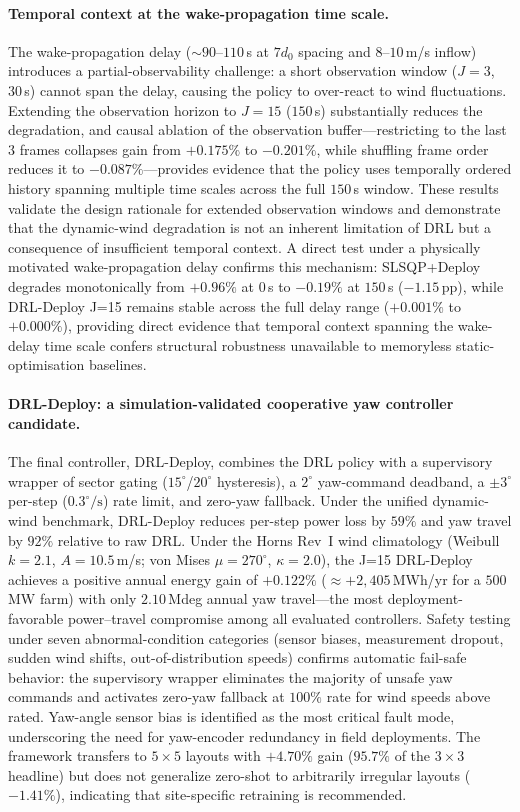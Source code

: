 \documentclass[final,5p,times]{elsarticle}
\begin{document}
\paragraph{Temporal context at the wake-propagation time scale.}
The wake-propagation delay (${\sim}90$--$110$\,s at $7d_0$ spacing and $8$--$10$\,m/s inflow) introduces a partial-observability challenge: a short observation window ($J{=}3$, $30$\,s) cannot span the delay, causing the policy to over-react to wind fluctuations. Extending the observation horizon to $J{=}15$ ($150$\,s) substantially reduces the degradation, and causal ablation of the observation buffer---restricting to the last $3$ frames collapses gain from $+0.175\%$ to $-0.201\%$, while shuffling frame order reduces it to $-0.087\%$---provides evidence that the policy uses temporally ordered history spanning multiple time scales across the full $150$\,s window. These results validate the design rationale for extended observation windows and demonstrate that the dynamic-wind degradation is not an inherent limitation of DRL but a consequence of insufficient temporal context. A direct test under a physically motivated wake-propagation delay confirms this mechanism: SLSQP+Deploy degrades monotonically from $+0.96\%$ at $0$\,s to $-0.19\%$ at $150$\,s ($-1.15$\,pp), while DRL-Deploy J=15 remains stable across the full delay range ($+0.001\%$ to $+0.000\%$), providing direct evidence that temporal context spanning the wake-delay time scale confers structural robustness unavailable to memoryless static-optimisation baselines.

\paragraph{DRL-Deploy: a simulation-validated cooperative yaw controller candidate.}
The final controller, DRL-Deploy, combines the DRL policy with a supervisory wrapper of sector gating ($15^\circ$/$20^\circ$ hysteresis), a $2^\circ$ yaw-command deadband, a ${\pm}3^\circ$ per-step ($0.3^\circ\!/\!\mathrm{s}$) rate limit, and zero-yaw fallback. Under the unified dynamic-wind benchmark, DRL-Deploy reduces per-step power loss by $59\%$ and yaw travel by $92\%$ relative to raw DRL. Under the Horns Rev~I wind climatology (Weibull $k{=}2.1$, $A{=}10.5$\,m/s; von Mises $\mu{=}270^\circ$, $\kappa{=}2.0$), the J=15 DRL-Deploy achieves a positive annual energy gain of $\mathbf{+0.122\%}$ (${\approx}{+}2{,}405$\,MWh/yr for a $500$\,MW farm) with only $2.10$\,Mdeg annual yaw travel---the most deployment-favorable power--travel compromise among all evaluated controllers. Safety testing under seven abnormal-condition categories (sensor biases, measurement dropout, sudden wind shifts, out-of-distribution speeds) confirms automatic fail-safe behavior: the supervisory wrapper eliminates the majority of unsafe yaw commands and activates zero-yaw fallback at $100\%$ rate for wind speeds above rated. Yaw-angle sensor bias is identified as the most critical fault mode, underscoring the need for yaw-encoder redundancy in field deployments. The framework transfers to $5{\times}5$ layouts with $+4.70\%$ gain ($95.7\%$ of the $3{\times}3$ headline) but does not generalize zero-shot to arbitrarily irregular layouts ($-1.41\%$), indicating that site-specific retraining is recommended.
\end{document}
